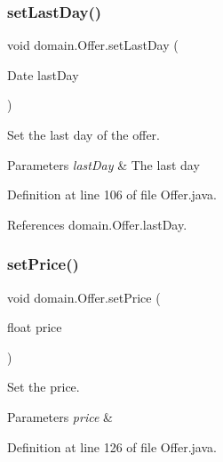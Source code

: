 \subsubsection{\texorpdfstring{setLastDay()}{setLastDay()}}
{\footnotesize\ttfamily void domain.\+Offer.\+set\+Last\+Day (\begin{DoxyParamCaption}\item[{Date}]{last\+Day }\end{DoxyParamCaption})}



Set the last day of the offer. 


\begin{DoxyParams}{Parameters}
{\em last\+Day} & The last day \\
\hline
\end{DoxyParams}


Definition at line 106 of file Offer.\+java.


\begin{DoxyCode}{0}

\end{DoxyCode}


References domain.\+Offer.\+last\+Day.

\mbox{\label{classdomain_1_1Offer_a8bd526902732e030571b6889c5507f4c}} 
\subsubsection{\texorpdfstring{setPrice()}{setPrice()}}
{\footnotesize\ttfamily void domain.\+Offer.\+set\+Price (\begin{DoxyParamCaption}\item[{float}]{price }\end{DoxyParamCaption})}



Set the price. 


\begin{DoxyParams}{Parameters}
{\em price} & \\
\hline
\end{DoxyParams}


Definition at line 126 of file Offer.\+java.


